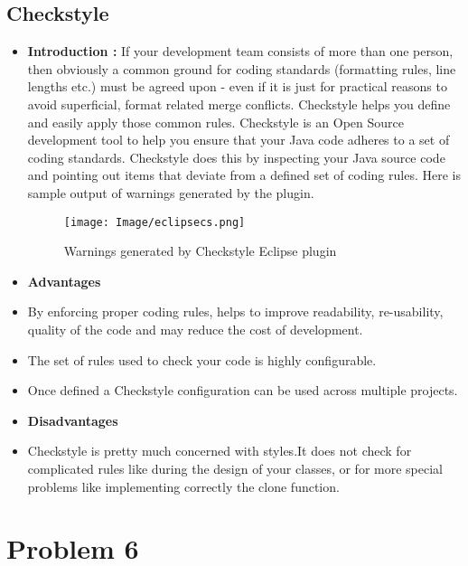 \documentclass[12pt]{report}
\begin{document}
{   
\clearpage
\subsection{Checkstyle}
\noindent
 \begin{itemize}
     \item \textbf{Introduction : } If your development team consists of more than one person, then obviously a common ground for coding standards (formatting rules, line lengths etc.) must be agreed upon - even if it is just for practical reasons to avoid superficial, format related merge conflicts. Checkstyle helps you define and easily apply those common rules. Checkstyle is an Open Source development tool to help you ensure that your Java code adheres to a set of coding standards. Checkstyle does this by inspecting your Java source code and pointing out items that deviate from a defined set of coding rules. Here is sample output of warnings generated by the plugin.
\begin{figure}[h!]
    \center\texttt{[image: Image/eclipsecs.png]}
    \caption{Warnings generated by Checkstyle Eclipse plugin}
\end{figure}
      \item\textbf{Advantages}
      \item By enforcing proper coding rules, helps to improve readability, re-usability, quality of the code and may reduce the cost of development.
      \item The set of rules used to check your code is highly configurable.
      \item Once defined a Checkstyle configuration can be used across multiple projects.
       \item\textbf{Disadvantages}
       \item Checkstyle is pretty much concerned with styles.It does not check for complicated rules like during the design of your classes, or for more special problems like implementing correctly the clone function.
 \end{itemize}
    
\section{Problem 6}
}
\end{document}
